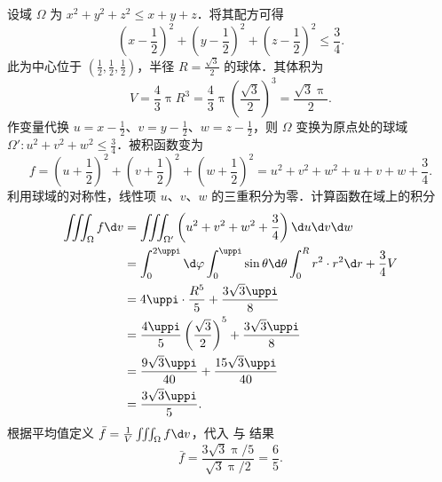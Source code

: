 \begin{solution}
    设域 $\Omega$ 为 $x^2 + y^2 + z^2 \le x + y + z$．将其配方可得
    \begin{equation}\label{eq:Domain-Center-1}
        \left( x - \frac{1}{2} \right)^2 + \left( y - \frac{1}{2} \right)^2 + \left( z - \frac{1}{2} \right)^2 \le \frac{3}{4}.
    \end{equation}
    此为中心位于 $(\frac{1}{2}, \frac{1}{2}, \frac{1}{2})$，半径 $R = \frac{\sqrt{3}}{2}$ 的球体．其体积为
    \begin{equation}\label{eq:Volume-1}
        V = \frac{4}{3} \uppi R^3 = \frac{4}{3} \uppi \left( \frac{\sqrt{3}}{2} \right)^3 = \frac{\sqrt{3} \uppi}{2}.
    \end{equation}
    作变量代换 $u = x - \frac{1}{2}$、$v = y - \frac{1}{2}$、$w = z - \frac{1}{2}$，则 $\Omega$ 变换为原点处的球域 $\Omega': u^2 + v^2 + w^2 \le \frac{3}{4}$．被积函数变为
    \begin{equation}\label{eq:Function-Decomp-1}
        f = \left( u + \frac{1}{2} \right)^2 + \left( v + \frac{1}{2} \right)^2 + \left( w + \frac{1}{2} \right)^2 = u^2 + v^2 + w^2 + u + v + w + \frac{3}{4}.
    \end{equation}
    利用球域的对称性，线性项 $u$、$v$、$w$ 的三重积分为零．计算函数在域上的积分
    \begin{equation}\label{eq:Integral-Calculation-1}
        \begin{aligned}
            \iiint_{\Omega} f \d v & = \iiint_{\Omega'} \left( u^2 + v^2 + w^2 + \frac{3}{4} \right) \d u \d v \d w                                         \\
                                   & = \int_{0}^{2 \uppi} \d \varphi \int_{0}^{\uppi} \sin \theta \d \theta \int_{0}^{R} r^2 \cdot r^2 \d r + \frac{3}{4} V \\
                                   & = 4 \uppi \cdot \frac{R^5}{5} + \frac{3 \sqrt{3} \uppi}{8}                                                             \\
                                   & = \frac{4 \uppi}{5} \left( \frac{\sqrt{3}}{2} \right)^5 + \frac{3 \sqrt{3} \uppi}{8}                                   \\
                                   & = \frac{9 \sqrt{3} \uppi}{40} + \frac{15 \sqrt{3} \uppi}{40}                                                           \\
                                   & = \frac{3 \sqrt{3} \uppi}{5}.
        \end{aligned}
    \end{equation}
    根据平均值定义 $\bar{f} = \frac{1}{V} \iiint_{\Omega} f \d v$，代入  与  结果
    \begin{equation}
        \bar{f} = \frac{3 \sqrt{3} \uppi / 5}{\sqrt{3} \uppi / 2} = \boxed{\frac{6}{5}}.
    \end{equation}
\end{solution}

